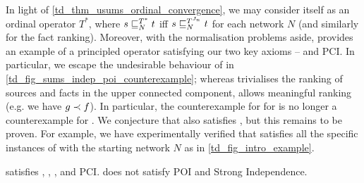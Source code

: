 In light of \cref{td_thm_usums_ordinal_convergence}, we may consider \usums{}
itself as an ordinal operator $T^*$, where $s \sqsubseteq_N^{T^*} t$ iff $s
\sqsubseteq_N^{T^{J_n}} t$ for each network $N$ (and similarly for the fact ranking).
Moreover, with the normalisation problems aside, \usums{} provides an example
of a principled operator satisfying our two key axioms -- \coherence{} and PCI. In
particular, we escape the undesirable behaviour of \sums{} in
\cref{td_fig_sums_indep_poi_counterexample}; whereas \sums{} trivialises the
ranking of sources and facts in the upper connected component, \usums{} allows
meaningful ranking (e.g. we have $g \prec f$). In particular, the counterexample
for \monotonicity{} for \sums{} is no longer a counterexample for \usums{}. We
conjecture that \usums{} also satisfies \monotonicity{}, but this remains to be
proven. For example, we have experimentally verified that \usums{} satisfies
all the specific instances of \monotonicity{} with the starting network $N$ as in
\cref{td_fig_intro_example}.

\begin{theorem}
\label{td_thm_usums_axioms}
    \usums{} satisfies \coherence{}, \symmetry{}, \unanimity{}, \groundedness{} and
PCI. \usums{} does not satisfy POI and Strong Independence.
\end{theorem}

